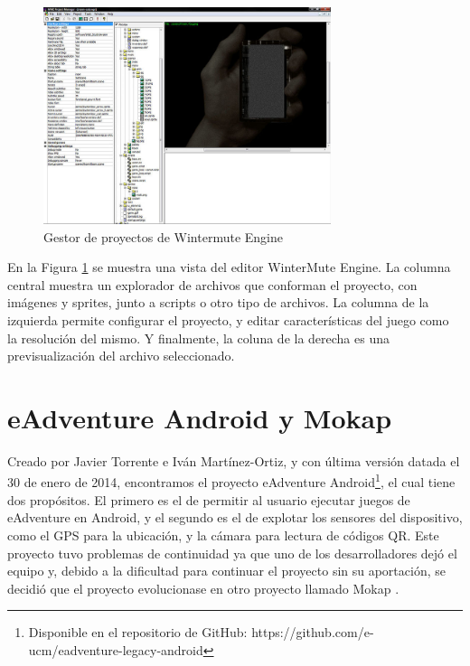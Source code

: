\begin{figure}[htb]
	\centerline{\includegraphics[height=2.5in]{figures/wme.jpg}}
	\caption[WinterMute Engine]{Gestor de proyectos de Wintermute Engine}
	\label{wmengine}
\end{figure}

En la Figura \ref{wmengine} se muestra una vista del editor WinterMute Engine. La columna central muestra un explorador de archivos que conforman el proyecto, con imágenes y sprites, junto a scripts o otro tipo de archivos. La columna de la izquierda permite configurar el proyecto, y editar características del juego como la resolución del mismo. Y finalmente, la coluna de la derecha es una previsualización del archivo seleccionado.

\section{eAdventure Android y Mokap}
\label{eandroidmokap}

Creado por Javier Torrente e Iván Martínez-Ortiz, y con última versión datada el 30 de enero de 2014, encontramos el proyecto eAdventure Android\footnote{Disponible en el repositorio de GitHub: https://github.com/e-ucm/eadventure-legacy-android}, el cual tiene dos propósitos. El primero es el de permitir al usuario ejecutar juegos de eAdventure en Android, y el segundo es el de explotar los sensores del dispositivo, como el GPS para la ubicación, y la cámara para lectura de códigos QR. Este proyecto tuvo problemas de continuidad ya que uno de los desarrolladores dejó el equipo y, debido a la dificultad para continuar el proyecto sin su aportación, se decidió que el proyecto evolucionase en otro proyecto llamado Mokap \cite{Torrente2015}.

